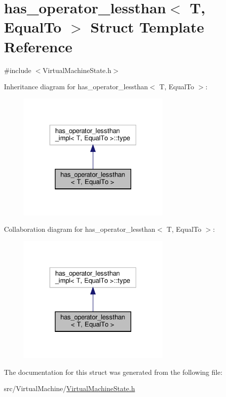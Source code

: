 \hypertarget{structhas__operator__lessthan}{}\section{has\+\_\+operator\+\_\+lessthan$<$ T, Equal\+To $>$ Struct Template Reference}
\label{structhas__operator__lessthan}


{\ttfamily \#include $<$Virtual\+Machine\+State.\+h$>$}



Inheritance diagram for has\+\_\+operator\+\_\+lessthan$<$ T, Equal\+To $>$\+:
\nopagebreak
\begin{figure}[H]
\begin{center}
\leavevmode
\includegraphics[width=211pt]{structhas__operator__lessthan__inherit__graph}
\end{center}
\end{figure}


Collaboration diagram for has\+\_\+operator\+\_\+lessthan$<$ T, Equal\+To $>$\+:
\nopagebreak
\begin{figure}[H]
\begin{center}
\leavevmode
\includegraphics[width=211pt]{structhas__operator__lessthan__coll__graph}
\end{center}
\end{figure}


The documentation for this struct was generated from the following file\+:\begin{DoxyCompactItemize}
\item 
src/\+Virtual\+Machine/\hyperlink{_virtual_machine_state_8h}{Virtual\+Machine\+State.\+h}\end{DoxyCompactItemize}
